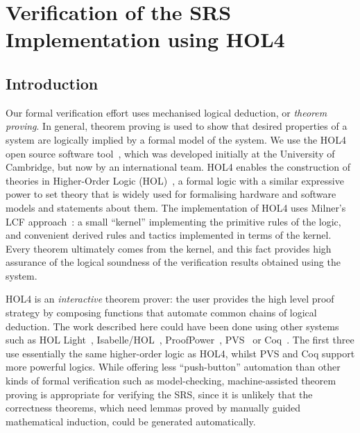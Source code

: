 \documentclass{llncs}
\begin{document}
\section{Verification of the SRS Implementation using HOL4}
\label{sec-verification}

\subsection{Introduction}
Our formal verification effort uses mechanised logical deduction, or \emph{theorem proving}.
In general, theorem proving is used to show that desired properties of a system are logically implied by a formal model of the system.
We use the HOL4 open source software tool~\cite{HOL4,DBLP:conf/tphol/SlindN08}, which was developed initially at the University of Cambridge, but now by an international team.
HOL4 enables the construction of theories in Higher-Order Logic (HOL)~\cite{DBLP:journals/jsyml/Church40}, a formal logic with a similar expressive power to set theory that is widely used for formalising hardware and software models and statements about them.
The implementation of HOL4 uses Milner's LCF approach~\cite{Milner:1972:LCF:891954}: a small ``kernel'' implementing the primitive rules of the logic, and convenient derived rules and tactics implemented in terms of the kernel.
Every theorem ultimately comes from the kernel, and this fact provides high assurance of the logical soundness of the verification results obtained using the system.

HOL4 is an \emph{interactive} theorem prover: the user provides the high level proof strategy by composing functions that automate common chains of logical deduction.
The work described here could have been done using other systems such as HOL Light~\cite{HOLLight,DBLP:conf/tphol/Harrison09a}, Isabelle/HOL~\cite{Isabelle}, ProofPower~\cite{ProofPower}, PVS~\cite{PVS,DBLP:conf/tphol/OwreS08} or Coq~\cite{Coq}.
The first three use essentially the same higher-order logic as HOL4, whilst PVS and Coq support more powerful logics.
While offering less ``push-button'' automation than other kinds of formal verification such as model-checking, machine-assisted theorem proving is appropriate for verifying the SRS, since it is unlikely that the correctness theorems, which need lemmas proved by manually guided mathematical induction, could be generated automatically.
\end{document}
